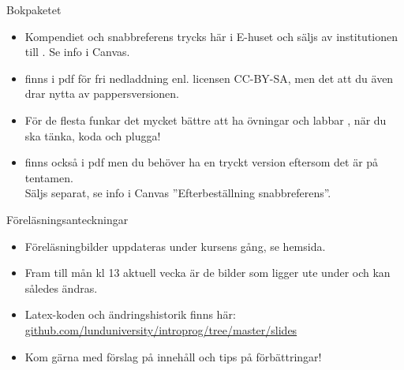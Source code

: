 \else


\begin{SlideExtra}{Bokpaketet}\SlideFontSmall
{}
\begin{itemize}
\item Kompendiet och snabbreferens trycks här i E-huset och säljs av institutionen till . Se info i Canvas.

\item {} finns i pdf för fri nedladdning enl. licensen CC-BY-SA, men det  att du även drar nytta av pappersversionen.

\item För de flesta funkar det mycket bättre att ha övningar och labbar  , när du ska tänka, koda och plugga!

\item {} finns också i pdf men du behöver ha en tryckt version eftersom det är  på tentamen. \\ Säljs separat, se info i Canvas ''Efterbeställning snabbreferens''.

\end{itemize}
\end{SlideExtra}

\begin{SlideExtra}{Föreläsningsanteckningar}
\begin{itemize}
\item Föreläsningbilder uppdateras under kursens gång, se hemsida.
\item Fram till mån kl 13 aktuell vecka är de bilder som ligger ute under  och kan således ändras.
\item Latex-koden och ändringshistorik finns här: \\
\href{https://github.com/lunduniversity/introprog/tree/master/slides}{github.com/lunduniversity/introprog/tree/master/slides}
\item Kom gärna med förslag på innehåll och tips på förbättringar!
\end{itemize}
\end{SlideExtra}
\fi


